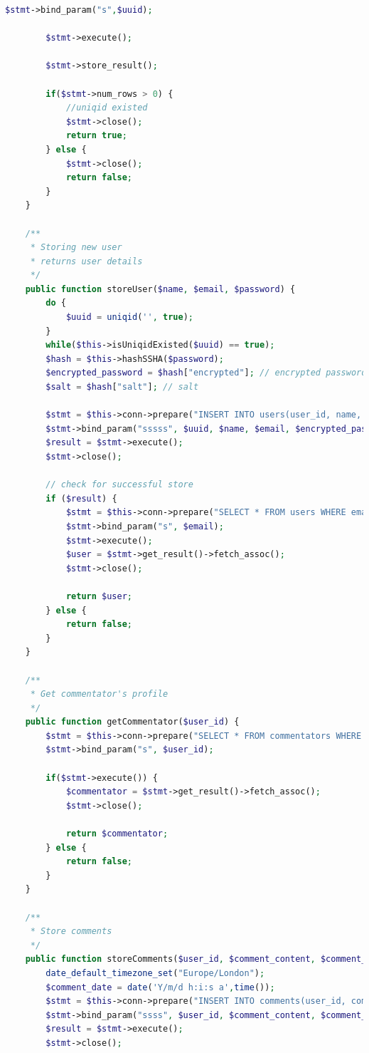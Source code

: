 \documentclass{article}
\begin{document}
\begin{landscape}
\begin{lstlisting}[language=php,basicstyle=\tiny,showstringspaces=false]
		$stmt->bind_param("s",$uuid);
		
		$stmt->execute();
		
		$stmt->store_result();
		
		if($stmt->num_rows > 0) {
			//uniqid existed
			$stmt->close();
			return true;
		} else {
			$stmt->close();
			return false;
		}
	}
 
    /**
     * Storing new user
     * returns user details
     */
    public function storeUser($name, $email, $password) {
		do {
			$uuid = uniqid('', true);
		}
        while($this->isUniqidExisted($uuid) == true);
        $hash = $this->hashSSHA($password);
        $encrypted_password = $hash["encrypted"]; // encrypted password
        $salt = $hash["salt"]; // salt
 
        $stmt = $this->conn->prepare("INSERT INTO users(user_id, name, email, encrypted_password, salt, created_at) VALUES(?, ?, ?, ?, ?, NOW())");
        $stmt->bind_param("sssss", $uuid, $name, $email, $encrypted_password, $salt);
        $result = $stmt->execute();
        $stmt->close();
 
        // check for successful store
        if ($result) {
            $stmt = $this->conn->prepare("SELECT * FROM users WHERE email = ?");
            $stmt->bind_param("s", $email);
            $stmt->execute();
            $user = $stmt->get_result()->fetch_assoc();
            $stmt->close();
 
            return $user;
        } else {
            return false;
        }
    }
	
	/**
	 * Get commentator's profile
	 */
	public function getCommentator($user_id) {
		$stmt = $this->conn->prepare("SELECT * FROM commentators WHERE user_id = ?");
		$stmt->bind_param("s", $user_id);
		
		if($stmt->execute()) {
			$commentator = $stmt->get_result()->fetch_assoc();
			$stmt->close();
			
			return $commentator;
		} else {
			return false;
		}
	}
	
	/**
	 * Store comments
	 */
	public function storeComments($user_id, $comment_content, $comment_rating) {
		date_default_timezone_set("Europe/London");
		$comment_date = date('Y/m/d h:i:s a',time());
		$stmt = $this->conn->prepare("INSERT INTO comments(user_id, comment_content, comment_rating, comment_date) VALUES(?, ?, ?, ?)");
		$stmt->bind_param("ssss", $user_id, $comment_content, $comment_rating, $comment_date);
		$result = $stmt->execute();
		$stmt->close();
		

\end{lstlisting}
\end{landscape}
\end{document}
